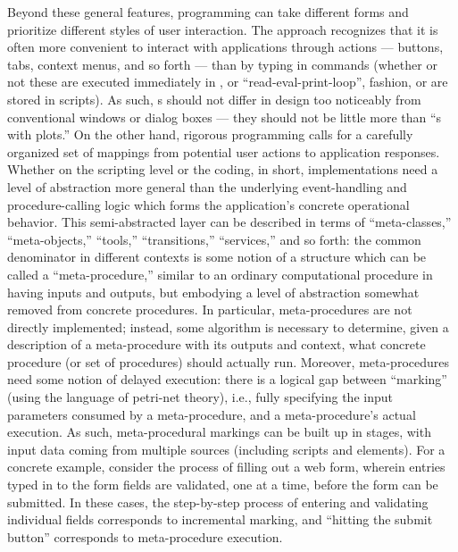 \documentclass[11pt,letterpaper]{article}
\newcommand{\ATextCClr}[1]{\textcolor{atcColor}{\textbf{#1}}}
\newcommand{\IDN}{\resizebox{!}{7pt}{\AcronymText{IDN}}}
\newcommand{\REPL}{\resizebox{!}{7pt}{\AcronymText{REPL}}}
\newcommand{\MdsX}{\resizebox{!}{7.5pt}{\ATextCClr{MdsX}}}
\newcommand{\GUI}{\resizebox{!}{7pt}{\AcronymText{GUI}}}
\newcommand{\textscc}[1]{{\color{orr!35!black}{{%
						\fontfamily{Cabin-TLF}\fontseries{b}\selectfont{\textsc{\scriptsize{#1}}}}}}}
\newcommand{\AcronymText}[1]{{\textscc{#1}}}
\newcommand{\p}[1]{

\vspace{1em}#1}
\newcommand{\q}[1]{{\fontfamily{qcr}\selectfont ``}#1{\fontfamily{qcr}\selectfont ''}}
\begin{document}
{\p{Beyond these general features, \IDN{} 
programming can take different forms and 
prioritize different styles of user 
interaction.  The \MdsX{} approach recognizes 
that it is often more convenient to 
interact with applications through 
\GUI{} actions --- buttons, tabs, context 
menus, and so forth --- than by typing 
in commands (whether or not these are 
executed immediately in \REPL{}, or 
\q{read-eval-print-loop}, fashion, or are 
stored in scripts).  As such, \IDN{}s 
should not differ in design too noticeably 
from conventional \GUI{} windows or dialog 
boxes --- they should not be little more 
than \q{\REPL{}s with plots.}  On the other 
hand, rigorous \GUI{} programming 
calls for a carefully organized 
set of mappings from potential user 
actions to application responses.  
Whether on the scripting level or 
the \GUI{} coding, in short, 
implementations need a level of abstraction 
more general than the underlying event-handling 
and procedure-calling logic which forms 
the application's concrete operational 
behavior.  This semi-abstracted layer 
can be described in terms of \q{meta-classes,} 
\q{meta-objects,} \q{tools,} \q{transitions,} 
\q{services,} and so forth: the common 
denominator in different contexts is some 
notion of a structure which can be called 
a \q{meta-procedure,} similar to an ordinary 
computational procedure in having inputs and 
outputs, but embodying a level of abstraction 
somewhat removed from concrete procedures.  
In particular, meta-procedures are not 
directly implemented; instead, some algorithm 
is necessary to determine, given a description 
of a meta-procedure with its outputs and 
context, what concrete procedure (or set of 
procedures) should actually run.  Moreover, 
meta-procedures need some notion of delayed 
execution: there is a logical gap between 
\q{marking} (using the language of petri-net 
theory), i.e., fully specifying the input 
parameters consumed by a meta-procedure, and a 
meta-procedure's actual execution.  
As such, meta-procedural markings can be 
built up in stages, with input data coming 
from multiple sources (including scripts and 
\GUI{} elements).  For a concrete example, 
consider the process of filling out a web 
form, wherein entries typed in to the form 
fields are validated, one at a time, 
before the form can be submitted.  
In these cases, the step-by-step process of 
entering and validating individual fields 
corresponds to incremental marking, and 
\q{hitting the submit button} corresponds 
to meta-procedure execution.}

}
\end{document}
